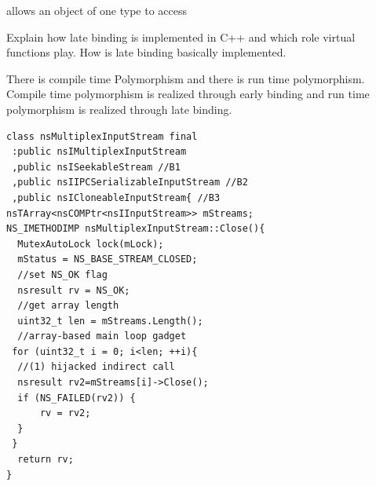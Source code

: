 allows an object of one type to access



Explain how late binding is implemented in C++ and which role virtual functions play.
How is late binding basically implemented.

There is compile time Polymorphism and there is run time polymorphism.
Compile time polymorphism is realized through early binding and run time
polymorphism is realized through late binding.


\newsavebox{\firstlisting}
\begin{lrbox}{\firstlisting}
\begin{minipage}[c]{0.48\textwidth}
\begin{verbatim}
class nsMultiplexInputStream final 
 :public nsIMultiplexInputStream 
 ,public nsISeekableStream //B1
 ,public nsIIPCSerializableInputStream //B2
 ,public nsICloneableInputStream{ //B3
nsTArray<nsCOMPtr<nsIInputStream>> mStreams;
NS_IMETHODIMP nsMultiplexInputStream::Close(){
  MutexAutoLock lock(mLock);
  mStatus = NS_BASE_STREAM_CLOSED;
  //set NS_OK flag
  nsresult rv = NS_OK;
  //get array length
  uint32_t len = mStreams.Length();
  //array-based main loop gadget
 for (uint32_t i = 0; i<len; ++i){
  //(1) hijacked indirect call
  nsresult rv2=mStreams[i]->Close();
  if (NS_FAILED(rv2)) {
      rv = rv2;
  }
 }
  return rv;
}
\end{verbatim}
\end{minipage}
\end{lrbox}

